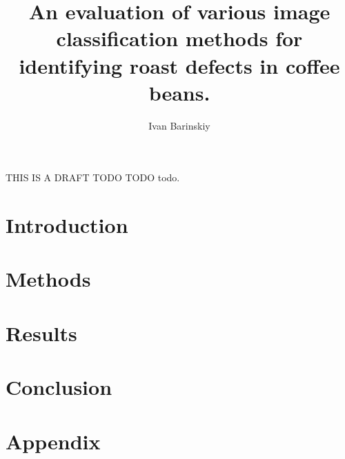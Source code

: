 \documentclass{./styles/UoYCSproject}
\author{Ivan Barinskiy}
\title{An evaluation of various image classification methods for identifying roast defects in coffee beans.}
\begin{document}
\maketitle
\listoffigures
\listoftables

\begin{summary}
THIS IS A DRAFT TODO TODO todo.
\end{summary}

\chapter{Introduction}
\label{ch:introduction}

\chapter{Methods}
\label{ch:methods2}

\chapter{Results}
\label{ch:results}

\chapter{Conclusion}
\label{ch:conclusion}


\appendix
\chapter{Appendix}

\printbibliography
\end{document}

